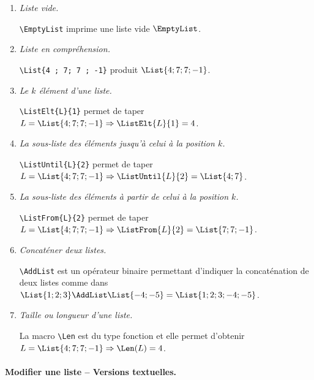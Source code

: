\begin{enumerate}
	\item \textit{Liste vide.}

		  \verb+\EmptyList+ imprime une liste vide $\EmptyList$.


	\item \textit{Liste en compréhension.}

		  \verb+\List{4 ; 7; 7 ; -1}+ produit $\List{4 ; 7; 7 ; -1}$.


	\item \textit{Le $k$\ieme{} élément d'une liste.}

		  \verb+\ListElt{L}{1}+ permet de taper $L = \List{4 ; 7; 7 ; -1} \Rightarrow \ListElt{L}{1} = 4$.


	\item \textit{La sous-liste des éléments jusqu'à celui à la position $k$.}

		  \verb+\ListUntil{L}{2}+ permet de taper $L = \List{4 ; 7; 7 ; -1} \Rightarrow \ListUntil{L}{2} = \List{4 ; 7}$.


	\item \textit{La sous-liste des éléments à partir de celui à la position $k$.}

		  \verb+\ListFrom{L}{2}+ permet de taper $L = \List{4 ; 7; 7 ; -1} \Rightarrow \ListFrom{L}{2} = \List{7 ; 7 ; -1}$.


	\item \textit{Concaténer deux listes.}

		  \verb+\AddList+ est un opérateur binaire permettant d'indiquer la concaténation de deux listes comme dans $\List{1 ; 2 ; 3} \AddList \List{-4 ; -5} = \List{1 ; 2 ; 3 ; -4 ; -5}$.


	\item \textit{Taille ou longueur d'une liste.}

		  La macro \verb+\Len+ est du type fonction et elle permet d'obtenir $L = \List{4 ; 7; 7 ; -1} \Rightarrow \Len(L) = 4$.
\end{enumerate}



\paragraph{Modifier une liste -- Versions textuelles.}\phantom{XX}\smallskip


